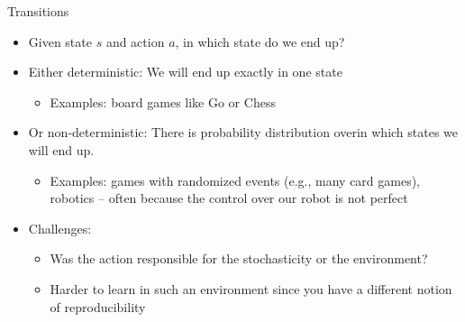 \documentclass[aspectratio=169]{../latex_main/tntbeamer}  %
\begin{document}
\begin{frame}[c]{Transitions}
	
	\begin{itemize}
		\item Given state $s$ and action $a$, in which state do we end up?
		\smallskip
		\pause
		\item Either deterministic: We will end up exactly in one state
		\begin{itemize}
			\item Examples: board games like Go or Chess
		\end{itemize}
		\pause
		\item Or non-deterministic: There is probability distribution over\newline in which states we will end up.
		\begin{itemize}
			\item Examples: games with randomized events (e.g., many card games), robotics -- often because the control over our robot is not perfect
		\end{itemize}
		\item Challenges:
		\begin{itemize}
			\item Was the action responsible for the stochasticity or the environment?
			\item Harder to learn in such an environment since you have a different notion of reproducibility
		\end{itemize}
	\end{itemize}
	
\end{frame}
\end{document}
